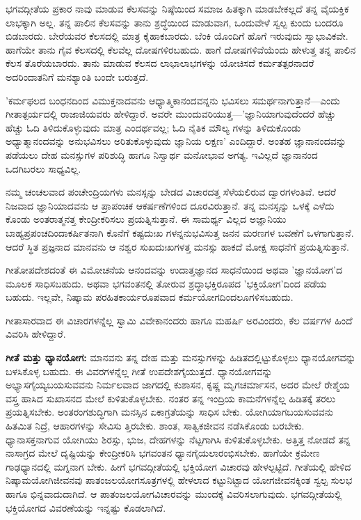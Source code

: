 ಭಗವದ್ಗೀತೆಯ ಪ್ರಕಾರ ನಾವು ಮಾಡುವ ಕೆಲಸವನ್ನು ನಿಷ್ಠೆಯಿಂದ ಸಮಾಜ ಹಿತಕ್ಕಾಗಿ ಮಾಡಬೇಕಲ್ಲದೆ ತನ್ನ ವೈಯಕ್ತಿಕ ಲಾಭಕ್ಕಾಗಿ ಅಲ್ಲ. ತನ್ನ ಪಾಲಿನ ಕೆಲಸವನ್ನು ತಾನು ಶ್ರದ್ಧೆಯಿಂದ ಮಾಡುವಾಗ, ಒಂದುವೇಳೆ ಸ್ವಲ್ಪ ಕುಂದು ಬಂದರೂ ಬಿಡಬಾರದು. ಬೇರೆಯವರ ಕೆಲಸದಲ್ಲಿ ಮಾತ್ರ ಕೈಹಾಕಬಾರದು. ಬೆಂಕಿ ಯೊಂದಿಗೆ ಹೊಗೆ ಇರುವುದು ಸ್ವಾಭಾವಿಕವೇ. ಹಾಗೆಯೇ ತಾನು ಗೈವ ಕೆಲಸದಲ್ಲಿ ಕೆಲವೆಲ್ಲ ದೋಷಗಳಿರಬಹುದು. ಹಾಗೆ ದೋಷಗಳಿವೆಯೆಂದು ಹೇಳುತ್ತ ತನ್ನ ಪಾಲಿನ ಕೆಲಸ ತೊರೆಯಬಾರದು. ತಾನು ಮಾಡುವ ಕೆಲಸದ ಲಾಭಾಲಾಭಗಳನ್ನು ಯೋಚಿಸದೆ ಕರ್ಮತತ್ಪರನಾದರೆ ಅದರಿಂದಾತನಿಗೆ ಮನಶ್ಯಾಂತಿ ಬಂದೇ ಬರುತ್ತದೆ.

'ಕರ್ಮಫಲದ ಬಂಧನದಿಂದ ವಿಮುಕ್ತನಾದವನು ಆಧ್ಯಾತ್ಮಿಕಾನಂದವನ್ನನು ಭವಿಸಲು ಸಮರ್ಥನಾಗುತ್ತಾನೆ—ಎಂದು ಗೀತಾತ್ಪರ್ಯದಲ್ಲಿ ರಾಜಾಜಿಯವರು ಹೇಳಿದ್ದಾರೆ. ಅವರೇ ಮುಂದುವರಿಯುತ್ತ—'ಜ್ಞಾನಿಯಾಗುವುದೆಂದರೆ ಹೆಚ್ಚು ಹೆಚ್ಚು ಓದಿ ತಿಳಿದುಕೊಳ್ಳುವುದು ಮಾತ್ರ ಎಂದರ್ಥವಲ್ಲ; ಓದಿ ನೈತಿಕ ಮೌಲ್ಯ ಗಳನ್ನು ತಿಳಿದುಕೊಂಡು ಅಧ್ಯಾತ್ಮಾನಂದವನ್ನು ಅನುಭವಿಸಲು ಅರಿತುಕೊಳ್ಳುವುದು ಜ್ಞಾನಿಯ ಲಕ್ಷಣ' ಎಂದಿದ್ದಾರೆ. ಅಂತಹ ಜ್ಞಾನಾನಂದವನ್ನು ಪಡೆಯಲು ದೇಹ ಮನಸ್ಸುಗಳ ಪರಿಶುದ್ಧಿ ಹಾಗೂ ನಿಸ್ವಾರ್ಥ ಮನೋಭಾವ ಅಗತ್ಯ. ಇವಿಲ್ಲದೆ ಜ್ಞಾನಾನಂದ ಒದಗಿಬರಲು ಸಾಧ್ಯವಿಲ್ಲ.

ನಮ್ಮ ಚಂಚಲವಾದ ಪಂಚೇಂದ್ರಿಯಗಳು ಮನಸ್ಸನ್ನು ಬೇಡದ ವಿಚಾರದತ್ತ ಸೆಳೆಯಲಿರುವ ದ್ವಾರಗಳಂತಿವೆ. ಆದರೆ ನಿಜವಾದ ಜ್ಞಾನಿಯಾದವನು ಆ ಪ್ರಾಪಂಚಿಕ ಆಕರ್ಷಣೆಗಳಿಂದ ದೂರವಿರುತ್ತಾನೆ. ತನ್ನ ಮನಸ್ಸನ್ನು ಒಳಕ್ಕೆ ಎಳೆದು ಕೊಂಡು ಅಂತರಾತ್ಮನತ್ತ ಕೇಂದ್ರೀಕರಿಸಲು ಪ್ರಯತ್ನಿಸುತ್ತಾನೆ. ಈ ಸಾಮರ್ಥ್ಯ ವಿಲ್ಲದ ಅಜ್ಞಾನಿಯು ಬಾಹ್ಯಪ್ರಪಂಚದಿಂದಾಕರ್ಷಿತನಾಗಿ ಕೊನೆಗೆ ಕಷ್ಟದುಃಖ ಗಳನ್ನನುಭವಿಸುತ್ತ ಜನನ ಮರಣಗಳ ಬವಣೆಗೆ ಒಳಗಾಗುತ್ತಾನೆ. ಆದರೆ ಸ್ಥಿತ ಪ್ರಜ್ಞನಾದ ಮಾನವನು ಆ ನಶ್ವರ ಸುಖದುಃಖಗಳತ್ತ ಮನಸ್ಸು ಹಾಕದೆ ಮೋಕ್ಷ ಸಾಧನೆಗೆ ಪ್ರಯತ್ನಿಸುತ್ತಾನೆ.

ಗೀತೋಪದೇಶದಂತೆ ಈ ವಿಮೋಚನೆಯ ಆನಂದವನ್ನು ಉದಾತ್ತಜ್ಞಾನದ ಸಾಧನೆಯಿಂದ ಅಥವಾ 'ಜ್ಞಾನಯೋಗ'ದ ಮೂಲಕ ಸಾಧಿಸಬಹುದು. ಅಥವಾ ಭಗವಂತನಲ್ಲಿ ತೋರುವ ಶ್ರದ್ಧಾಭಕ್ತಿರೂಪದ 'ಭಕ್ತಿಯೋಗ'ದಿಂದ ಪಡೆಯ ಬಹುದು. ಇಲ್ಲವೇ, ನಿಷ್ಕಾಮ ಪರಹಿತಕಾರ್ಯರೂಪವಾದ ಕರ್ಮಯೋಗದಿಂದಲೂಗಳಿಸಬಹುದು.

ಗೀತಾಸಾರವಾದ ಈ ವಿಚಾರಗಳನ್ನೆಲ್ಲ ಸ್ವಾಮಿ ವಿವೇಕಾನಂದರು ಹಾಗೂ ಮಹರ್ಷಿ ಅರವಿಂದರು, ಕೆಲ ವರ್ಷಗಳ ಹಿಂದೆ ವಿವರಿಸಿ ಹೇಳಿದ್ದಾರೆ.

\textbf{ಗೀತೆ ಮತ್ತು ಧ್ಯಾನಯೋಗ:} ಮಾನವನು ತನ್ನ ದೇಹ ಮತ್ತು ಮನಸ್ಸುಗಳನ್ನು ಹಿಡಿತದಲ್ಲಿಟ್ಟುಕೊಳ್ಳಲು ಧ್ಯಾನಯೋಗವನ್ನು ಬಳಸಿಕೊಳ್ಳ ಬಹುದು. ಈ ವಿವರಗಳನ್ನೆಲ್ಲ ಗೀತೆ ಉಪದೇಶಗೈಯುತ್ತದೆ. ಧ್ಯಾನಯೋಗವನ್ನು ಅಭ್ಯಾಸಗೈಯ್ಯಬಯಸುವವನು ನಿರ್ಮಲವಾದ ಜಾಗದಲ್ಲಿ ಕುಶಾಸನ, ಕೃಷ್ಣ ಮೃಗಚರ್ಮಾಸನ, ಅದರ ಮೇಲೆ ರೇಶ್ಮೆಯ ವಸ್ತ್ರ ಹಾಸಿದ ಸುಖಾಸನದ ಮೇಲೆ ಕುಳಿತುಕೊಳ್ಳಬೇಕು. ನಂತರ ತನ್ನ ಇಂದ್ರಿಯ ಕಾಮನೆಗಳನ್ನೆಲ್ಲ ಹಿಡಿತಕ್ಕೆ ತರಲು ಪ್ರಯತ್ನಿಸಬೇಕು. ಅಂತರಂಗಶುದ್ಧಿಗಾಗಿ ಮನಸ್ಸಿನ ಏಕಾಗ್ರತೆಯನ್ನು ಸಾಧಿಸ ಬೇಕು. ಯೋಗಿಯಾಗಬಯಸುವವನು ಹಿತಮಿತ ನಿದ್ರೆ, ಆಹಾರಗಳನ್ನು ಸೇವಿಸು ತ್ತಿರಬೇಕು. ಶಾಂತ, ಸಾತ್ವಿಕಜೀವನ ನಡೆಸಿಕೊಂಡು ಬರಬೇಕು. ಧ್ಯಾನಾಸಕ್ತನಾಗುವ ಯೋಗಿಯು ಶಿರಸ್ಸು, ಭುಜ, ದೇಹಗಳನ್ನು ನೆಟ್ಟಗಾಗಿಸಿ ಕುಳಿತುಕೊಳ್ಳಬೇಕು. ಅತ್ತಿತ್ತ ನೋಡದೆ ತನ್ನ ನಾಸಾಗ್ರದ ಮೇಲೆ ದೃಷ್ಟಿಯನ್ನು ಕೇಂದ್ರೀಕರಿಸಿ ಭಗವಂತನ ಧ್ಯಾನಗೈಯಲಾರಂಭಿಸಬೇಕು. ಹಾಗೆಯೇ ಕ್ರಮೇಣ ಗಾಢಧ್ಯಾನದಲ್ಲಿ ಮಗ್ನನಾಗ ಬೇಕು. ಹೀಗೆ ಭಗವದ್ಗೀತೆಯಲ್ಲಿ ಭಕ್ತಿಯೋಗ ವಿಚಾರವು ಹೇಳಲ್ಪಟ್ಟಿದೆ. ಗೀತೆಯಲ್ಲಿ ಹೇಳಿದ ನಿಷ್ಕಾಮಯೋಗಿಜೀವನವು ಪಾತಂಜಲಯೋಗಸೂತ್ರಗಳಲ್ಲಿ ಹೇಳಲಾದ ಕಟ್ಟುನಿಟ್ಟಾದ ಯೋಗಜೀವನಕ್ಕಿಂತ ಸ್ವಲ್ಪ ಸುಲಭ ಹಾಗೂ ಭಿನ್ನವಾದುದಾಗಿದೆ. ಆ ಪಾತಂಜಲಯೋಗವಿಚಾರವನ್ನು ಮುಂದಕ್ಕೆ ವಿವರಿಸಲಾಗುವುದು. ಭಗವದ್ಗೀತೆಯಲ್ಲಿ ಭಕ್ತಿಯೋಗದ ವಿವರಣೆಯನ್ನು ಇನ್ನಷ್ಟು ಕೊಡಲಾಗಿದೆ.

